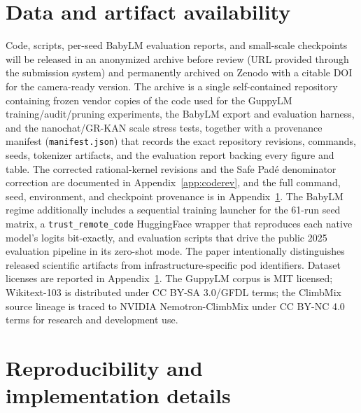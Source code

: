 \documentclass[11pt]{article}
\newcommand{\modelname}[1]{\textsc{#1}}
\newcommand{\grkan}{\modelname{GR-KAN}}
\begin{document}
\section*{Data and artifact availability}

Code, scripts, per-seed BabyLM evaluation reports, and small-scale checkpoints will be released in an anonymized archive before review (URL provided through the submission system) and permanently archived on Zenodo with a citable DOI for the camera-ready version. The archive is a single self-contained repository containing frozen vendor copies of the code used for the GuppyLM training/audit/pruning experiments, the BabyLM export and evaluation harness, and the nanochat/\grkan{} scale stress tests, together with a provenance manifest (\texttt{manifest.json}) that records the exact repository revisions, commands, seeds, tokenizer artifacts, and the evaluation report backing every figure and table. The corrected rational-kernel revisions and the Safe Pad\'{e} denominator correction are documented in Appendix~\ref{app:coderev}, and the full command, seed, environment, and checkpoint provenance is in Appendix~\ref{app:reprod}. The BabyLM regime additionally includes a sequential training launcher for the 61-run seed matrix, a \texttt{trust\_remote\_code} HuggingFace wrapper that reproduces each native model's logits bit-exactly, and evaluation scripts that drive the public 2025 evaluation pipeline \cite{babylm2025eval} in its zero-shot mode. The paper intentionally distinguishes released scientific artifacts from infrastructure-specific pod identifiers. Dataset licenses are reported in Appendix~\ref{app:reprod}. The GuppyLM corpus is MIT licensed; Wikitext-103 is distributed under CC BY-SA 3.0/GFDL terms; the ClimbMix source lineage is traced to NVIDIA Nemotron-ClimbMix under CC BY-NC 4.0 terms for research and development use.

\appendix

\section{Reproducibility and implementation details}
\label{app:reprod}

\end{document}
